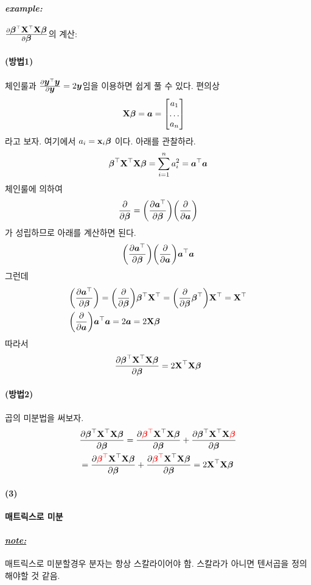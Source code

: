 \documentclass[12pt,oneside,english,a4paper]{article}
\def\note{\paragraph{\Large\textit{\underline{note:}}}\Large}
\def\ex{\paragraph{\Large\textit{example:}}\Large}
\newcommand{\para}[1]{\paragraph{\Large(#1)}\Large}
\def\three{\paragraph{\Large(3)}\Large}
\newcommand{\bs}[1]{\mbox{\boldmath $#1$}}
\newcommand{\bsa}{\mbox{\boldmath $a$}}
\newcommand{\bsy}{\mbox{\boldmath $y$}}
\newcommand{\bfx}{\mbox{$\bf{x}$}}
\newcommand{\bfX}{\mbox{$\bf{X}$}}
\begin{document}
\ex $\frac{\partial \bs{\beta}^\top \bfX^\top\bfX\bs{\beta}}{\partial \bs{\beta}}$의 계산: 
\para{방법1} 체인룰과 $\frac{\partial\bsy^\top\bsy}{\partial\bsy}=2\bsy$임을 이용하면 쉽게 풀 수 있다. 
편의상 
\begin{align*}
& \bfX\bs{\beta}=\bsa=\begin{bmatrix}a_1 \\ \dots \\ a_n\end{bmatrix}
\end{align*}
라고 보자. 여기에서 $a_i=\bfx_i\bs{\beta}$ 이다. 아래를 관찰하라. 
\[
\bs{\beta}^\top \bfX^\top \bfX \bs{\beta}=\sum_{i=1}^{n}a_i^2=\bsa^\top\bsa
\]
체인룰에 의하여 
\[
\frac{\partial}{\partial\bs{\beta}}
=\bigg(\frac{\partial\bsa^\top}{\partial\bs{\beta}}\bigg)
\bigg(\frac{\partial}{\partial\bsa}\bigg)
\]
가 성립하므로 아래를 계산하면 된다. 
\[
\bigg(\frac{\partial\bsa^\top}{\partial\bs{\beta}}\bigg)\bigg(
\frac{\partial}{\partial\bsa}\bigg)\bsa^\top\bsa
\]
그런데 
\begin{align*}
& \bigg(\frac{\partial\bsa^\top}{\partial\bs{\beta}}\bigg)=\bigg(\frac{\partial}{\partial\bs{\beta}}\bigg)\bs{\beta}^\top\bfX^\top=
\bigg(\frac{\partial}{\partial\bs{\beta}}\bs{\beta}^\top\bigg)\bfX^\top=\bfX^\top \\ 
& \bigg(\frac{\partial}{\partial\bsa}\bigg)\bsa^\top\bsa=2\bsa=2\bfX\bs{\beta} \end{align*}
따라서 
\[
\frac{\partial \bs{\beta}^\top \bfX^\top\bfX\bs{\beta}}{\partial \bs{\beta}}=2\bfX^\top\bfX\bs{\beta}
\]
\para{방법2} 곱의 미분법을 써보자. 
\begin{align*}
&\frac{\partial \bs{\beta}^\top \bfX^\top\bfX\bs{\beta}}{\partial \bs{\beta}}=
\frac{\partial \textcolor{red}{\bs{\beta}^\top} \bfX^\top\bfX\bs{\beta}}{\partial \bs{\beta}}+
\frac{\partial \bs{\beta}^\top \bfX^\top\bfX\textcolor{red}{\bs{\beta}}}{\partial \bs{\beta}}\\
&=\frac{\partial \textcolor{red}{\bs{\beta}^\top} \bfX^\top\bfX\bs{\beta}}{\partial \bs{\beta}}+
\frac{\partial \textcolor{red}{\bs{\beta}^\top} \bfX^\top\bfX\bs{\beta}}{\partial \bs{\beta}}=2\bfX^\top\bfX\bs{\beta}
\end{align*}


\three\textbf{매트릭스로 미분}
\note 매트릭스로 미분할경우 분자는 항상 스칼라이어야 함. 스칼라가 아니면 텐서곱을 정의해야할 것 같음. 
\end{document}
